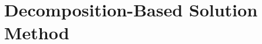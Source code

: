 \documentclass[ijoc,nonblindrev]{informs3} %
\renewcommand{\P}{\mathbb{P}}
\newcommand{\p}[1]{\P \left[ #1 \right]}
\begin{document}
% 

\section{Decomposition-Based Solution Method}
\label{sec:soln_algorithm}
\end{document}
